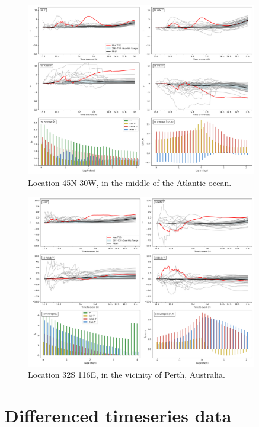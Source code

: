 \begin{figure}[h]
\caption{Location 45N 30W, in the middle of the Atlantic ocean.}
\centering
\includegraphics[width=0.9\textwidth]{images/sup2.png}
\end{figure}

\begin{figure}[h]
\caption{Location 32S 116E, in the vicinity of Perth, Australia.}
\centering
\includegraphics[width=0.9\textwidth]{images/sup3.png}
\end{figure}

\section{Differenced timeseries data}

